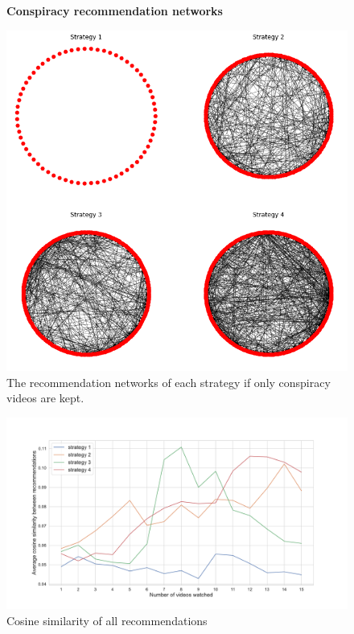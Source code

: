 
\begin{appendices}
\setcounter{table}{1}
\setcounter{figure}{0}

\begin{figure}[h]
  \textbf{Conspiracy recommendation networks}\par\medskip
  \centering
  \includegraphics[keepaspectratio, width=\textwidth]{images/conspiracy networks.png}
  \caption{The recommendation networks of each strategy if only conspiracy videos are kept.}
  \label{appendix:networks}
\end{figure}

\begin{figure}
\centering
\includegraphics[width=\textwidth]{images/All sim.pdf}
\caption{Cosine similarity of all recommendations}
\label{appendix:all_sim}
\end{figure}



\end{appendices}
